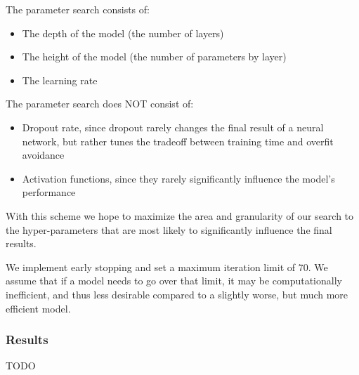 \documentclass[11pt, a4paper]{article}
\begin{document}
	The parameter search consists of:
	\begin{itemize}
		\item The depth of the model (the number of layers)
		\item The height of the model (the number of parameters by layer) 
		\item The learning rate
	\end{itemize}

	
	The parameter search does NOT consist of:
	\begin{itemize}
		\item Dropout rate, since dropout rarely changes the final result of a neural network, but rather tunes the tradeoff between training time and overfit avoidance
		\item Activation functions, since they rarely significantly influence the model's performance
	\end{itemize}
	
	With this scheme we hope to maximize the area and granularity of our search to the hyper-parameters that are most likely to significantly influence the final results.
	
	We implement early stopping and set a maximum iteration limit of $70$. We assume that if a model needs to go over that limit, it may be computationally inefficient, and thus less desirable compared to a slightly worse, but much more efficient model.
	
	\subsubsection{Results}
	
	TODO
	
\end{document}
